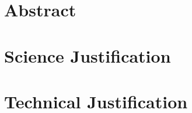 \documentclass[12pt]{article}
\begin{document}
\pagestyle{empty}

\section*{Abstract}


\clearpage


\section*{Science Justification}


\clearpage


\section*{Technical Justification}

\end{document}
